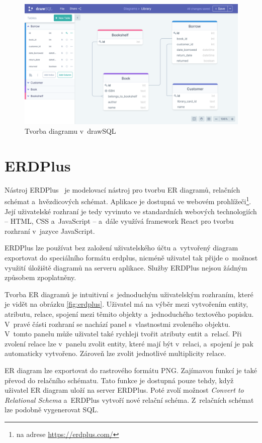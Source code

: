 \begin{figure}
  \centering
  \includegraphics[width=\textwidth]{../img/drawsql.png}
  \caption{Tvorba diagramu v~drawSQL}
  \label{fig:drawsql}
\end{figure}

\section{ERDPlus}

Nástroj ERDPlus~\cite{erdplus21} je modelovací nástroj pro tvorbu ER diagramů,
relačních schémat a~hvězdicových schémat. Aplikace je dostupná ve webovém
prohlížeči\footnote{na adrese \url{https://erdplus.com/}}. Její uživatelské rozhraní je
tedy vyvinuto ve standardních webových technologiích -- HTML, CSS a~JavaScript
-- a~dále využívá framework React pro tvorbu rozhraní v~jazyce JavaScript.

ERDPlus lze používat bez založení uživatelského účtu a~vytvořený diagram
exportovat do speciálního formátu erdplus, nicméně uživatel tak přijde o~možnost
využití úložiště diagramů na serveru aplikace. Služby ERDPlus nejsou žádným
způsobem zpoplatněny.

Tvorba ER diagramů je intuitivní s~jednoduchým uživatelským rozhraním, které je
vidět na obrázku \ref{fig:erdplus}. Uživatel má na výběr mezi vytvořením entity,
atributu, relace, spojení mezi těmito objekty a~jednoduchého textového popisku.
V~pravé části rozhraní se nachází panel s~vlastnostmi zvoleného objektu. V~tomto
panelu může uživatel také rychleji tvořit atributy entit a~relací. Při zvolení
relace lze v~panelu zvolit entity, které mají být v~relaci, a~spojení je pak
automaticky vytvořeno. Zároveň lze zvolit jednotlivé multiplicity relace.

ER diagram lze exportovat do rastrového formátu PNG. Zajímavou funkcí je také
převod do relačního schématu. Tato funkce je dostupná pouze tehdy, když uživatel
ER diagram uloží na server ERDPlus. Poté zvolí možnost \emph{Convert to
Relational Schema} a~ERDPlus vytvoří nové relační schéma. Z~relačních schémat
lze podobně vygenerovat SQL.

